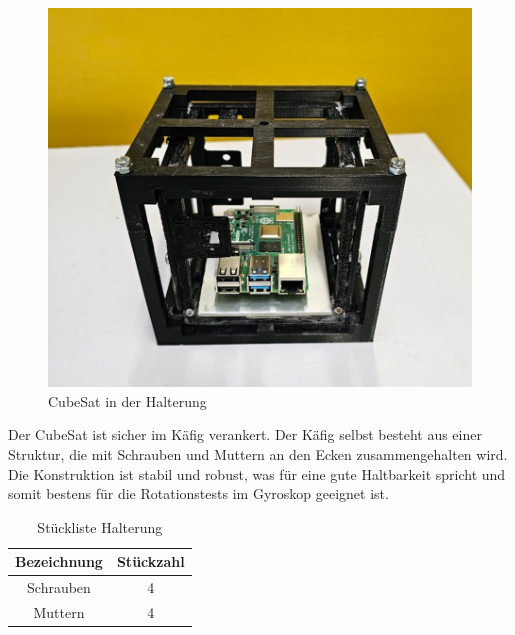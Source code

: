 \begin{figure}[H]
    \centering
    \includegraphics[scale=0.7]{image/cubeinhalterung.jpg}
    \caption{CubeSat in der Halterung}
    \label{fig:enter-label}
\end{figure}
\vspace{3mm}
Der CubeSat ist sicher im Käfig verankert. Der Käfig selbst besteht aus einer Struktur, die mit Schrauben und Muttern an den Ecken zusammengehalten wird. Die Konstruktion ist stabil und robust, was für eine gute Haltbarkeit spricht und somit bestens für die Rotationstests im Gyroskop geeignet ist. \\
\vspace{3mm}
\begin{table}[H]
    \centering
    \begin{tabular}{ | c | c | } 
  \hline
   \textbf{Bezeichnung} & \textbf{Stückzahl}\\ 
  \hline
   Schrauben  & 4\\ 
  \hline
  Muttern & 4 \\ 
  \hline
\end{tabular}
    \caption{Stückliste Halterung}
\end{table}
